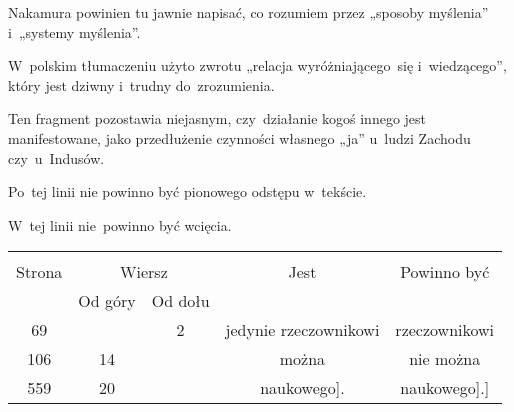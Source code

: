 \documentclass[a4paper,11pt]{article}
\begin{document}
\vspace{\spaceTwo}













\start {} Nakamura powinien tu jawnie napisać, co rozumiem przez
„sposoby myślenia” i~„systemy myślenia”.

\vspace{\spaceFour}


\start {} W~polskim tłumaczeniu użyto zwrotu „relacja
wyróżniającego~się i~wiedzącego”, który jest dziwny i~trudny
do~zrozumienia.

\vspace{\spaceFour}


\start {} Ten fragment pozostawia niejasnym,
czy~działanie kogoś innego jest manifestowane, jako przedłużenie
czynności własnego „ja” u~ludzi Zachodu czy~u~Indusów.

\vspace{\spaceFour}


\start {} Po~tej linii nie powinno być pionowego odstępu
w~tekście.

\vspace{\spaceFour}


\start {} W~tej linii nie~powinno być wcięcia.






\begin{center}

  \begin{tabular}{|c|c|c|c|c|}
    \hline
    & \multicolumn{2}{c|}{} & & \\
    Strona & \multicolumn{2}{c|}{Wiersz} & Jest
                              & Powinno być \\ \cline{2-3}
    & Od góry & Od dołu & & \\
    \hline
    69  & &  2 & jedynie rzeczownikowi & rzeczownikowi \\
    106 & 14 & & można & nie można \\
    559 & 20 & & naukowego]. & naukowego].] \\
    \hline
  \end{tabular}

\end{center}
\end{document}
